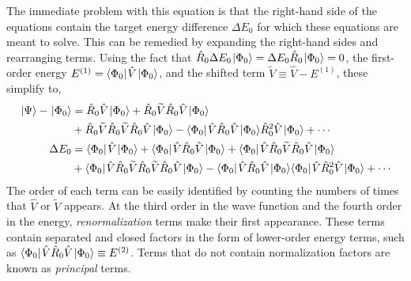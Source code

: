 \documentclass[thesis.tex]{subfiles}
\begin{document}
The immediate problem with this equation is that the right-hand side of the equations contain the target energy difference $\Delta E_{0}$ for which these equations are meant to solve.  This can be remedied by expanding the right-hand sides and rearranging terms.  Using the fact that $\hat{R}_{0}\Delta E_{0}\hspace{1pt}\lvert \Phi_{0} \rangle = \Delta E_{0}\hat{R}_{0}\hspace{1pt}\lvert \Phi_{0} \rangle = 0$, the first-order energy $E^{(1)} = \langle \Phi_{0} |\hspace{1pt}\hat{V}\hspace{1pt}\lvert \Phi_{0} \rangle$, and the shifted term $\widetilde{V} \equiv \hat{V} - E^{(1)}$, these simplify to,
\begin{align}
  \hspace{1pt}\lvert \Psi \rangle - \hspace{1pt}\lvert \Phi_{0} \rangle &= \hat{R}_{0}\hat{V}\hspace{1pt}\lvert \Phi_{0} \rangle + \hat{R}_{0}\widetilde{V}\hat{R}_{0}\hat{V}\hspace{1pt}\lvert \Phi_{0} \rangle \notag \\
  &+ \hat{R}_{0}\widetilde{V}\hat{R}_{0}\widetilde{V}\hat{R}_{0}\hat{V}\hspace{1pt}\lvert \Phi_{0} \rangle - \langle \Phi_{0} |\hspace{1pt}\hat{V}\hat{R}_{0}\hat{V}\hspace{1pt}\lvert \Phi_{0} \rangle\hat{R}^{2}_{0}\hat{V}\hspace{1pt}\lvert \Phi_{0} \rangle + \cdots \\
  \Delta E_{0} &= \langle \Phi_{0} |\hspace{1pt}\hat{V}\hspace{1pt}\lvert \Phi_{0} \rangle + \langle \Phi_{0} |\hspace{1pt}\hat{V}\hat{R}_{0}\hat{V}\hspace{1pt}\lvert \Phi_{0} \rangle + \langle \Phi_{0} |\hspace{1pt}\hat{V}\hat{R}_{0}\widetilde{V}\hat{R}_{0}\hat{V}\hspace{1pt}\lvert \Phi_{0} \rangle \notag \\
  &+ \langle \Phi_{0} |\hspace{1pt}\hat{V}\hat{R}_{0}\widetilde{V}\hat{R}_{0}\widetilde{V}\hat{R}_{0}\hat{V}\hspace{1pt}\lvert \Phi_{0} \rangle - \langle \Phi_{0} |\hspace{1pt}\hat{V}\hat{R}_{0}\hat{V}\hspace{1pt}\lvert \Phi_{0} \rangle\langle \Phi_{0} |\hspace{1pt}\hat{V}\hat{R}^{2}_{0}\hat{V}\hspace{1pt}\lvert \Phi_{0} \rangle + \cdots
\end{align}
The order of each term can be easily identified by counting the numbers of times that $\hat{V}$ or $\widetilde{V}$ appears.  At the third order in the wave function and the fourth order in the energy, \textit{renormalization} terms make their first appearance.  These terms contain separated and closed factors in the form of lower-order energy terms, such as $\langle \Phi_{0} |\hspace{1pt}\hat{V}\hat{R}_{0}\hat{V}\hspace{1pt}\lvert \Phi_{0} \rangle \equiv E^{(2)}$.  Terms that do not contain normalization factors are known as \textit{principal} terms.
\end{document}
